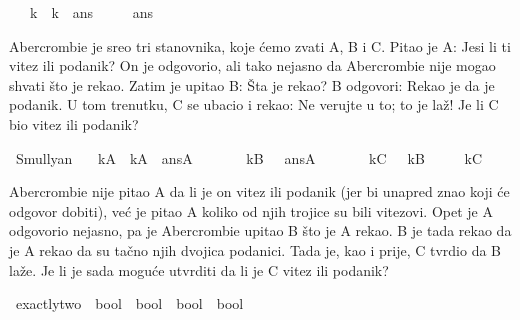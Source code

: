 \begin{isabellebody}
\begin{exercise}[subtitle=Logčki lavirinti.]
\ \ \ {\isachardoublequoteopen}k\ {\isasymlongleftrightarrow}\ {\isacharparenleft}{\kern0pt}k\ {\isasymlongleftrightarrow}\ ans{\isacharparenright}{\kern0pt}{\isachardoublequoteclose}\isanewline
\ \ \ \ \ ans%
\isadelimproof
%
\endisadelimproof
%
\isatagproof
%
\endisatagproof
{\isafoldproof}%
%
\isadelimproof
%
\endisadelimproof
%
\begin{isamarkuptext}%
Abercrombie je sreo tri stanovnika, koje ćemo zvati A, B i C. 
      Pitao je A: Jesi li ti vitez ili podanik?
      On je odgovorio, ali tako nejasno da Abercrombie nije mogao shvati 
      što je rekao. 
      Zatim je upitao B: Šta je rekao? 
      B odgovori: Rekao je da je podanik.
      U tom trenutku, C se ubacio i rekao: Ne verujte u to; to je laž! 
      Je li C bio vitez ili podanik?%
\end{isamarkuptext}\isamarkuptrue%
\isamarkupfalse%
\ Smullyan{\isacharunderscore}{\kern0pt}{}{\isacharunderscore}{\kern0pt}{}{\isacharcolon}{\kern0pt}\isanewline
\ \ \ {\isachardoublequoteopen}kA\ {\isasymlongleftrightarrow}\ {\isacharparenleft}{\kern0pt}kA\ {\isasymlongleftrightarrow}\ ansA{\isacharparenright}{\kern0pt}{\isachardoublequoteclose}\isanewline
\ \ \ \ \ \ \ {\isachardoublequoteopen}kB\ {\isasymlongleftrightarrow}\ {\isasymnot}\ ansA{\isachardoublequoteclose}\isanewline
\ \ \ \ \ \ \ {\isachardoublequoteopen}kC\ {\isasymlongleftrightarrow}\ {\isasymnot}\ kB{\isachardoublequoteclose}\isanewline
\ \ \ \ \ kC%
\isadelimproof
%
\endisadelimproof
%
\isatagproof
%
\endisatagproof
{\isafoldproof}%
%
\isadelimproof
%
\endisadelimproof
%
\begin{isamarkuptext}%
Abercrombie nije pitao A da li je on vitez ili podanik 
      (jer bi unapred znao koji će odgovor dobiti), 
      već je pitao A koliko od njih trojice su bili vitezovi. 
      Opet je A odgovorio nejasno, pa je Abercrombie upitao B što je A rekao. 
      B je tada rekao da je A rekao da su tačno njih dvojica podanici. 
      Tada je, kao i prije, C tvrdio da B laže. 
      Je li je sada moguće utvrditi da li je C vitez ili podanik?%
\end{isamarkuptext}\isamarkuptrue%
\isamarkupfalse%
\ exactly{\isacharunderscore}{\kern0pt}two\ {\isacharcolon}{\kern0pt}{\isacharcolon}{\kern0pt}\ {\isachardoublequoteopen}bool\ {\isasymRightarrow}\ bool\ {\isasymRightarrow}\ bool\ {\isasymRightarrow}\ bool{\isachardoublequoteclose}\ \isanewline

\end{exercise}
\end{isabellebody}
